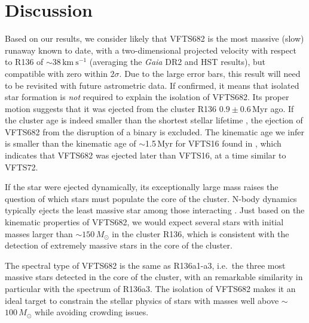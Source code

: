 \documentclass[apjl,twocolumn]{emulateapj}
\newcommand{\kms}{{\,\mathrm{km\ s^{-1}}}}
\begin{document}
\section{Discussion}
\label{sec:discussion}

Based on our results, we consider likely that VFTS682 is the most massive
(slow) runaway known to date, with a two-dimensional
projected velocity with respect to R136 of
$\sim38\kms$ (averaging the \emph{Gaia} DR2 and HST
results), but compatible with zero within $2\sigma$. Due to the large error bars, this result will need
to be revisited with future astrometric data. %
If confirmed, it means that isolated star formation is
\emph{not} required to explain the isolation of VFTS682. Its proper motion suggests that it was ejected from the cluster R136
$0.9\pm0.6$\,Myr ago. If the
cluster age \citep[$\lesssim2$\,Myr,][]{crowther:10, sabbi:12} is
indeed smaller than the shortest stellar lifetime
\citep[$\sim$3\,Myr,][]{brott:11,zapartas:17}, the ejection of VFTS682
from the disruption of a binary is excluded. %
The kinematic age we infer is smaller than the kinematic age of
$\sim$1.5\,Myr for VFTS16 found in \cite{lennon:18}, which indicates
that VFTS682 was ejected later than VFTS16, at a time similar to VFTS72.

If the star were ejected dynamically, its exceptionally large mass raises the question of which stars must populate
the core of the cluster. N-body dynamics typically ejects the least
massive star among those interacting \cite[e.g.,][]{banerjee:12}. Just
based on the kinematic properties of VFTS682, we would expect several
stars with initial masses larger than $\sim$$150\,M_\odot$ in the
cluster R136, which is consistent with the detection
of extremely massive stars in the core of the
cluster.

The spectral type of VFTS682
\citep[WNh5,][]{bestenlehner:11} is the same as R136a1-a3, i.e.~the
three most massive stars detected in the core of the cluster, %
 with an remarkable similarity in particular with
the spectrum of R136a3. The isolation of
VFTS682 makes it an ideal target to constrain the stellar physics of
stars with masses well above $\sim$$100\,M_\odot$ while avoiding
crowding issues.
\end{document}
